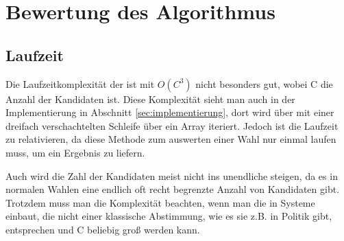 \newpage
\section{Bewertung des Algorithmus}
\label{sec:Bewertung2}



\subsection{Laufzeit}
\label{sec:Laufzeit}
Die Laufzeitkomplexität der \schulze ist mit $O(C^3)$ nicht besonders gut, wobei C die Anzahl der Kandidaten ist. Diese Komplexität sieht man auch in der Implementierung in Abschnitt \ref{sec:implementierung}, dort wird über mit einer dreifach verschachtelten Schleife über ein Array iteriert. Jedoch ist die Laufzeit zu relativieren, da diese Methode zum auswerten einer Wahl nur einmal laufen muss, um ein Ergebnis zu liefern.

Auch wird die Zahl der Kandidaten meist nicht ins unendliche steigen, da es in normalen Wahlen eine endlich oft recht begrenzte Anzahl von Kandidaten gibt. Trotzdem muss man die Komplexität beachten, wenn man die \schulze in Systeme einbaut, die nicht einer klassische Abstimmung, wie es sie z.B. in Politik gibt, entsprechen und C beliebig groß werden kann.


